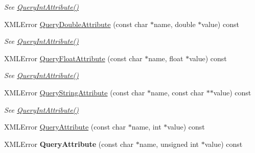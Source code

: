 \begin{DoxyCompactItemize}
\begin{DoxyCompactList}\small\item\em See \hyperlink{classtinyxml2_1_1XMLElement_a8b92c729346aa8ea9acd59ed3e9f2378}{Query\+Int\+Attribute()} \end{DoxyCompactList}\item 
X\+M\+L\+Error \hyperlink{classtinyxml2_1_1XMLElement_a1ffeed461d3e4020b39652cd6d3cd773}{Query\+Double\+Attribute} (const char $\ast$name, double $\ast$value) const \hypertarget{classtinyxml2_1_1XMLElement_a1ffeed461d3e4020b39652cd6d3cd773}{}\label{classtinyxml2_1_1XMLElement_a1ffeed461d3e4020b39652cd6d3cd773}

\begin{DoxyCompactList}\small\item\em See \hyperlink{classtinyxml2_1_1XMLElement_a8b92c729346aa8ea9acd59ed3e9f2378}{Query\+Int\+Attribute()} \end{DoxyCompactList}\item 
X\+M\+L\+Error \hyperlink{classtinyxml2_1_1XMLElement_a3f154e0b4b6903249ff9f758921758e5}{Query\+Float\+Attribute} (const char $\ast$name, float $\ast$value) const \hypertarget{classtinyxml2_1_1XMLElement_a3f154e0b4b6903249ff9f758921758e5}{}\label{classtinyxml2_1_1XMLElement_a3f154e0b4b6903249ff9f758921758e5}

\begin{DoxyCompactList}\small\item\em See \hyperlink{classtinyxml2_1_1XMLElement_a8b92c729346aa8ea9acd59ed3e9f2378}{Query\+Int\+Attribute()} \end{DoxyCompactList}\item 
X\+M\+L\+Error \hyperlink{classtinyxml2_1_1XMLElement_a237c9b3a2141a312312bc92e76aa1536}{Query\+String\+Attribute} (const char $\ast$name, const char $\ast$$\ast$value) const \hypertarget{classtinyxml2_1_1XMLElement_a237c9b3a2141a312312bc92e76aa1536}{}\label{classtinyxml2_1_1XMLElement_a237c9b3a2141a312312bc92e76aa1536}

\begin{DoxyCompactList}\small\item\em See \hyperlink{classtinyxml2_1_1XMLElement_a8b92c729346aa8ea9acd59ed3e9f2378}{Query\+Int\+Attribute()} \end{DoxyCompactList}\item 
X\+M\+L\+Error \hyperlink{classtinyxml2_1_1XMLElement_a3c6ca41fb1b6023b58ff4414c8eae2c0}{Query\+Attribute} (const char $\ast$name, int $\ast$value) const 
\item 
X\+M\+L\+Error {\bfseries Query\+Attribute} (const char $\ast$name, unsigned int $\ast$value) const \hypertarget{classtinyxml2_1_1XMLElement_ac72a26473f17d79c44f637227fd72cd5}{}\label{classtinyxml2_1_1XMLElement_ac72a26473f17d79c44f637227fd72cd5}


\end{DoxyCompactItemize}
